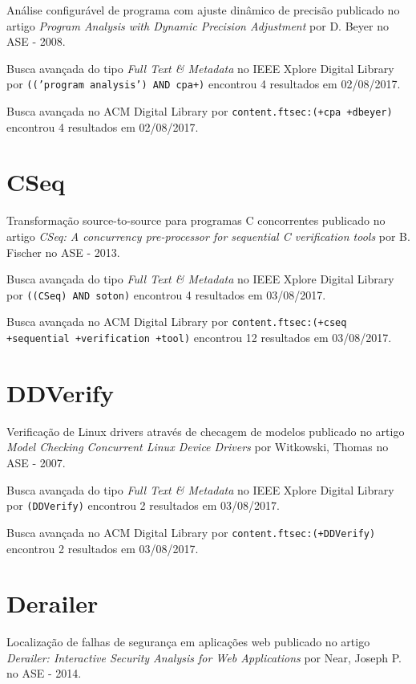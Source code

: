 Análise configurável de programa com ajuste dinâmico de precisão
publicado no artigo
{\it Program Analysis with Dynamic Precision Adjustment}
por
D. Beyer
no
ASE
-
2008.

Busca avançada do tipo {\it Full Text \& Metadata} no IEEE Xplore Digital Library por
\texttt{(('program analysis') AND cpa+)}
encontrou
4 resultados em
02/08/2017.

Busca avançada no ACM Digital Library por
\texttt{content.ftsec:(+cpa +dbeyer)}
encontrou
4 resultados em
02/08/2017.

\section{CSeq}

Transformação source-to-source para programas C concorrentes
publicado no artigo
{\it CSeq: A concurrency pre-processor for sequential C verification tools}
por
B. Fischer
no
ASE
-
2013.

Busca avançada do tipo {\it Full Text \& Metadata} no IEEE Xplore Digital Library por
\texttt{((CSeq) AND soton)}
encontrou
4 resultados em
03/08/2017.

Busca avançada no ACM Digital Library por
\texttt{content.ftsec:(+cseq +sequential +verification +tool)}
encontrou
12 resultados em
03/08/2017.

\section{DDVerify}

Verificação de Linux drivers através de checagem de modelos
publicado no artigo
{\it Model Checking Concurrent Linux Device Drivers}
por
Witkowski, Thomas
no
ASE
-
2007.

Busca avançada do tipo {\it Full Text \& Metadata} no IEEE Xplore Digital Library por
\texttt{(DDVerify)}
encontrou
2 resultados em
03/08/2017.

Busca avançada no ACM Digital Library por
\texttt{content.ftsec:(+DDVerify)}
encontrou
2 resultados em
03/08/2017.

\section{Derailer}

Localização de falhas de segurança em aplicações web
publicado no artigo
{\it Derailer: Interactive Security Analysis for Web Applications}
por
Near, Joseph P.
no
ASE
-
2014.

